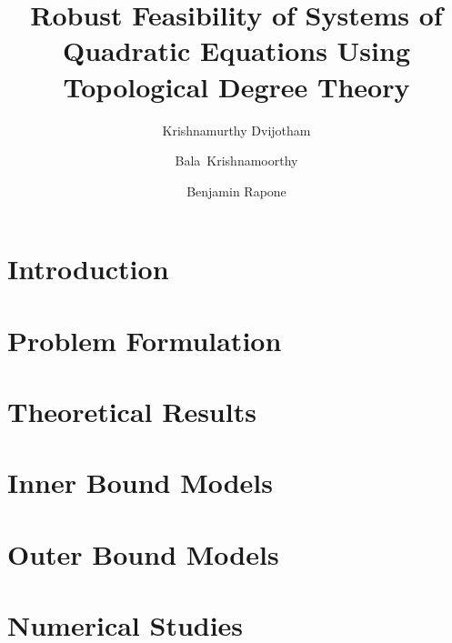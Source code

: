 \documentclass[11pt]{article}
\title{Robust Feasibility of Systems of Quadratic Equations Using Topological Degree Theory}
\author[*]{Krishnamurthy Dvijotham}
\author[**]{Bala~Krishnamoorthy}
\author[**]{Benjamin Rapone}
\affil[*]{Google DeepMind}
\affil[**]{Wahington State University}
\theoremstyle{plain}
\theoremstyle{definition}
\theoremstyle{remark}
\begin{document}
\maketitle


\section{Introduction} \label{sec:intro}  

\section{Problem Formulation} \label{sec:probform}  

\section{Theoretical Results} \label{sec:theory}  

\section{Inner Bound Models} \label{sec:inbdform}  

\section{Outer Bound Models} \label{sec:outbdform}  

\section{Numerical Studies} \label{sec:numstd}  







\end{document}
